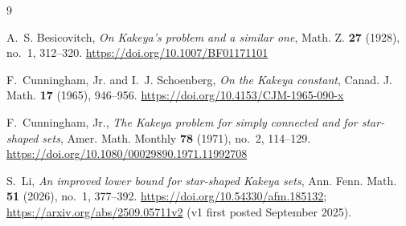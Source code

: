\documentclass[11pt]{article}
\theoremstyle{plain}
\theoremstyle{definition}
\theoremstyle{remark}
\begin{document}
\clearpage
\begin{thebibliography}{9}

A.~S. Besicovitch,
\newblock \emph{On Kakeya's problem and a similar one},
\newblock Math. Z. \textbf{27} (1928), no.~1, 312--320.
\newblock \url{https://doi.org/10.1007/BF01171101}

F.~Cunningham, Jr. and I.~J. Schoenberg,
\newblock \emph{On the Kakeya constant},
\newblock Canad. J. Math. \textbf{17} (1965), 946--956.
\newblock \url{https://doi.org/10.4153/CJM-1965-090-x}

F.~Cunningham, Jr.,
\newblock \emph{The Kakeya problem for simply connected and for star-shaped
  sets},
\newblock Amer. Math. Monthly \textbf{78} (1971), no.~2, 114--129.
\newblock \url{https://doi.org/10.1080/00029890.1971.11992708}

S.~Li,
\newblock \emph{An improved lower bound for star-shaped Kakeya sets},
\newblock Ann. Fenn. Math. \textbf{51} (2026), no.~1, 377--392.
\newblock \url{https://doi.org/10.54330/afm.185132};
  \url{https://arxiv.org/abs/2509.05711v2} (v1 first posted September 2025).

\end{thebibliography}
\end{document}
